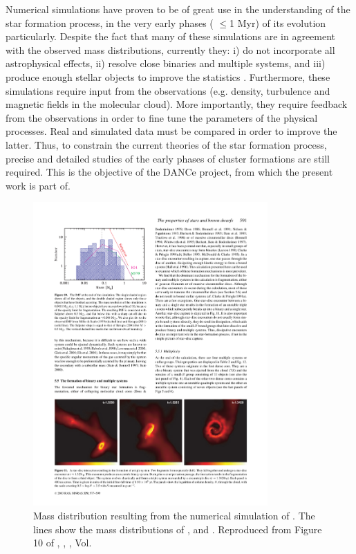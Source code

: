 Numerical simulations have proven to be of great use in the understanding of the star formation process, in the very early phases ( $\leq$1 Myr) of its evolution particularly.  Despite the fact that many of these simulations are in agreement with the observed mass distributions, currently they: i) do not incorporate all astrophysical effects, ii) resolve close binaries and multiple systems, and iii) produce enough stellar objects to improve the statistics \citep{Offner2014}. Furthermore, these simulations require input from the observations (e.g. density, turbulence and magnetic fields in the molecular cloud). More importantly, they require feedback from the observations in order to fine tune the parameters of the physical processes. Real and simulated data must be compared in order to improve the latter. Thus, to constrain the current theories of the star formation process, precise and detailed studies of the early phases of cluster formations are still required. This is the objective of the DANCe project, from which the present work is part of.


\begin{figure}[ht!]
\begin{center}
\includegraphics[width=0.8\textwidth]{background/Figures/F10_Bate2003.pdf}
\caption{Mass distribution resulting from the numerical simulation of \citet{2003MNRAS.339..577B}. The lines show the mass distributions of \citet{Salpeter1955}, \citet{1979ApJS...41..513M} and \citet{2001MNRAS.322..231K}. Reproduced from Figure 10 of \citet{2003MNRAS.339..577B}, \textit{}, , Vol. }
\label{fig:IMFBate2003}
\end{center}
\end{figure}

